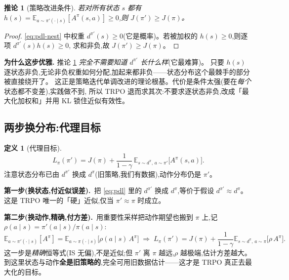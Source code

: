 \documentclass[11pt]{article}
\newcommand{\E}{\mathbb{E}}
\newcommand{\Ap}{A^{\pi}}
\newcommand{\dpi}{d^{\pi}}
\newcommand{\dpip}{d^{\pi'}}
\theoremstyle{plain}
\newtheorem{corollary}[theorem]{推论}
\theoremstyle{definition}
\newtheorem{definition}[theorem]{定义}
\theoremstyle{remark}
\begin{document}
\begin{corollary}[策略改进条件]\label{cor:improve}
若对所有状态 $s$ 都有 $h(s)=\E_{a\sim\pi'(\cdot\mid s)}[\Ap(s,a)]\ge 0$,则 $J(\pi')\ge J(\pi)$。
\end{corollary}
\begin{proof}
\eqref{eq:pdl-nest} 中权重 $\dpip(s)\ge 0$(它是概率)。若被加权的 $h(s)\ge0$,则逐项 $\dpip(s)h(s)\ge0$,
求和非负,故 $J(\pi')\ge J(\pi)$。
\end{proof}

\begin{keybox}
\textbf{为什么这步优雅.} 推论 \ref{cor:improve} \emph{完全不需要知道 $\dpip$ 长什么样}(它最难算)。
只要 $h(s)$ 逐状态非负,无论非负权重如何分配,加起来都非负——状态分布这个最棘手的部分被直接绕开了。
这正是策略迭代单调改进的理论根基。代价是条件太强(要在\emph{每个}状态都不变差),实践做不到,
所以 TRPO 退而求其次:不要求逐状态非负,改成「最大化加权和」并用 KL 锁住近似有效性。
\end{keybox}

\subsection{两步换分布:代理目标}

\begin{definition}[代理目标]
\begin{equation}\label{eq:surrogate}
L_\pi(\pi')=J(\pi)+\frac{1}{1-\gamma}\,\E_{s\sim \dpi,\,a\sim\pi'}\big[\Ap(s,a)\big].
\end{equation}
注意状态分布已由 $\dpip$ 换成 $\dpi$(旧策略,我们有数据),动作分布仍是 $\pi'$。
\end{definition}

\textbf{第一步(换状态,付近似误差).}\ 把 \eqref{eq:pdl} 里的 $\dpip$ 换成 $\dpi$,等价于假设 $\dpip\approx\dpi$。
这是 TRPO 唯一的「硬」近似,仅当 $\pi'\approx\pi$ 时成立。

\textbf{第二步(换动作,精确,付方差).}\ 用重要性采样把动作期望也搬到 $\pi$ 上,记 $\rho(a\mid s)=\pi'(a\mid s)/\pi(a\mid s)$:
\begin{equation}\label{eq:is}
\E_{a\sim\pi'(\cdot\mid s)}[\Ap]=\E_{a\sim\pi(\cdot\mid s)}\big[\rho(a\mid s)\,\Ap\big]
\;\Longrightarrow\;
L_\pi(\pi')=J(\pi)+\frac{1}{1-\gamma}\E_{s\sim\dpi,\,a\sim\pi}\big[\rho\,\Ap\big].
\end{equation}
这一步是\emph{精确}恒等式(IS 无偏),不是近似;但 $\pi'$ 离 $\pi$ 越远,$\rho$ 越极端,估计方差越大。
到这里状态与动作\textbf{全是旧策略的},完全可用旧数据估计——这才是 TRPO 真正去最大化的目标。
\end{document}
